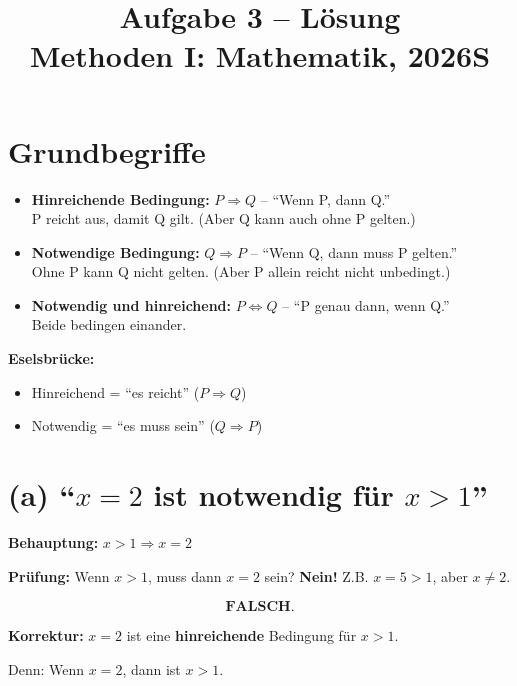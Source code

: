 \documentclass[12pt, a4paper]{article}
\title{\textbf{Aufgabe 3 -- Lösung} \\ Methoden I: Mathematik, 2026S}
\author{}
\date{}
\begin{document}
\maketitle

\section*{Grundbegriffe}

\begin{itemize}
    \item \textbf{Hinreichende Bedingung:} $P \Rightarrow Q$ -- "`Wenn P, dann Q."' \\
    P reicht aus, damit Q gilt. (Aber Q kann auch ohne P gelten.)

    \item \textbf{Notwendige Bedingung:} $Q \Rightarrow P$ -- "`Wenn Q, dann muss P gelten."' \\
    Ohne P kann Q nicht gelten. (Aber P allein reicht nicht unbedingt.)

    \item \textbf{Notwendig und hinreichend:} $P \Leftrightarrow Q$ -- "`P genau dann, wenn Q."' \\
    Beide bedingen einander.
\end{itemize}

\textbf{Eselsbrücke:}
\begin{itemize}
    \item Hinreichend = "`es reicht"' ($P \Rightarrow Q$)
    \item Notwendig = "`es muss sein"' ($Q \Rightarrow P$)
\end{itemize}

\section*{(a) "`$x = 2$ ist notwendig für $x > 1$"'}

\textbf{Behauptung:} $x > 1 \Rightarrow x = 2$

\textbf{Prüfung:} Wenn $x > 1$, muss dann $x = 2$ sein? \textbf{Nein!} Z.B. $x = 5 > 1$, aber $x \neq 2$.

\[
    \boxed{\textbf{FALSCH.}}
\]

\textbf{Korrektur:} $x = 2$ ist eine \textbf{hinreichende} Bedingung für $x > 1$.

Denn: Wenn $x = 2$, dann ist $x > 1$. \checkmark

\end{document}
